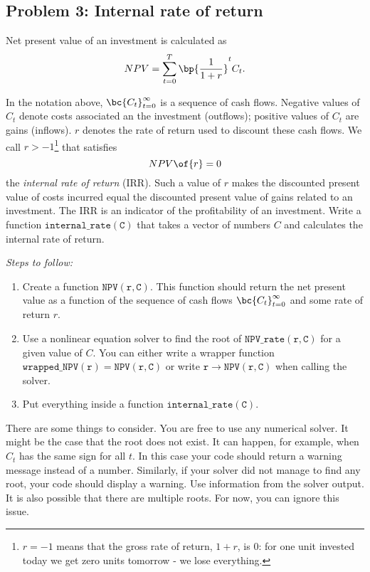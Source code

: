 \documentclass[english,hyperref={pdftex,pdfpagemode=UseNone,hidelinks}]{tufte-handout}
\begin{document}
\subsection*{Problem 3: Internal rate of return}

Net present value of an investment is calculated as 
\begin{align*}
    NPV = \sum_{t=0}^T \bp{\frac{1}{1+r}}^t C_t.
\end{align*}

In the notation above, $\bc{C_t}_{t=0}^\infty$ is a sequence of cash flows. Negative values of $C_t$ denote costs associated an the investment (outflows); positive values of $C_t$ are gains (inflows). $r$ denotes the rate of return used to discount these cash flows. We call $r>-1$\footnote{$r=-1$ means that the gross rate of return, $1+r$, is 0: for one unit invested today we get zero units tomorrow - we lose everything.} that satisfies $$NPV\of{r}=0$$ the \emph{internal rate of return} (IRR). Such a value of $r$ makes the discounted present value of costs incurred equal the discounted present value of gains related to an investment. The IRR is an indicator of the profitability of an investment. Write a function $\mathtt{internal \_ rate(C)}$ that takes a vector of numbers $C$ and calculates the internal rate of return. 

\emph{Steps to follow:}
\begin{enumerate}
    \item Create a function $\mathtt{NPV(r,C)}$. This function should return the net present value as a function of the sequence of cash flows $\bc{C_t}_{t=0}^\infty$ and some rate of return $r$. 
    \item Use a nonlinear equation solver to find the root of $\mathtt{NPV \_ rate(r,C)}$ for a given value of $C$. You can either write a wrapper function $\mathtt{wrapped \_ NPV(r) = \mathtt{NPV(r,C)}}$ or write  $\mathtt{r \rightarrow NPV(r,C)}$ when calling the solver.
    \item Put everything inside a function $\mathtt{internal \_ rate(C)}$. 
    
\end{enumerate}
There are some things to consider. You are free to use any numerical solver. It might be the case that the root does not exist. It can happen, for example, when $C_t$ has the same sign for all $t$. In this case your code should return a warning message instead of a number. Similarly, if your solver did not manage to find any root, your code should display a warning. Use information from the solver output. It is also possible that there are multiple roots. For now, you can ignore this issue. 
\end{document}
